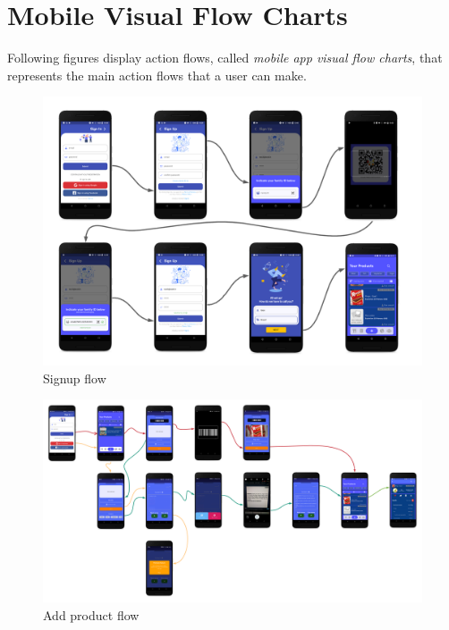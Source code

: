 \section{Mobile Visual Flow Charts}
Following figures display action flows, called \textit{mobile app visual flow charts}, that represents the main action flows that a user can make.





\begin{figure}[H]
   \centering
  \centerline{\includegraphics[width=190mm,scale=0.9]{./Images/flowdiagram/sign_up.png}}
  \caption{Signup flow}
\end{figure}



\begin{landscape}
\begin{figure}[h]
\vspace*{-2cm}
\noindent
\centering
\centerline{\includegraphics[scale = 0.65]{./Images/flowdiagram/add_product.png}}
\vspace*{-1cm}
    \caption{Add product flow}
    \vspace*{-12cm}
\end{figure}
\fillandplacepagenumber
\end{landscape}


